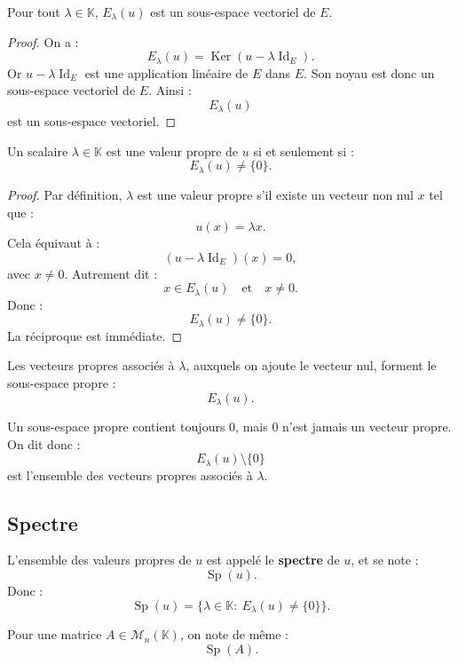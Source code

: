 \documentclass[11pt,a4paper]{article}
\newcommand{\K}{\mathbb K}
\newcommand{\M}{\mathcal M}
\newcommand{\Ker}{\operatorname{Ker}}
\newcommand{\Id}{\operatorname{Id}}
\newcommand{\Sp}{\operatorname{Sp}}
\begin{document}
\begin{theorembox}
Pour tout \(\lambda\in\K\), \(E_\lambda(u)\) est un sous-espace vectoriel de \(E\).
\end{theorembox}

\begin{proof}
On a :
\[
E_\lambda(u)=\Ker(u-\lambda\Id_E).
\]
Or \(u-\lambda\Id_E\) est une application linéaire de \(E\) dans \(E\).  
Son noyau est donc un sous-espace vectoriel de \(E\).  
Ainsi :
\[
E_\lambda(u)
\]
est un sous-espace vectoriel.
\end{proof}

\begin{theorembox}
Un scalaire \(\lambda\in\K\) est une valeur propre de \(u\) si et seulement si :
\[
E_\lambda(u)\neq\{0\}.
\]
\end{theorembox}

\begin{proof}
Par définition, \(\lambda\) est une valeur propre s'il existe un vecteur non nul \(x\) tel que :
\[
u(x)=\lambda x.
\]
Cela équivaut à :
\[
(u-\lambda\Id_E)(x)=0,
\]
avec \(x\neq0\).  
Autrement dit :
\[
x\in E_\lambda(u)
\quad\text{et}\quad
x\neq0.
\]
Donc :
\[
E_\lambda(u)\neq\{0\}.
\]
La réciproque est immédiate.
\end{proof}

\begin{retenirbox}
Les vecteurs propres associés à \(\lambda\), auxquels on ajoute le vecteur nul, forment le sous-espace propre :
\[
E_\lambda(u).
\]
\end{retenirbox}

\begin{erreurbox}
Un sous-espace propre contient toujours \(0\), mais \(0\) n'est jamais un vecteur propre.  
On dit donc :
\[
E_\lambda(u)\setminus\{0\}
\]
est l'ensemble des vecteurs propres associés à \(\lambda\).
\end{erreurbox}

\subsection{Spectre}

\begin{definitionbox}[Spectre]
L'ensemble des valeurs propres de \(u\) est appelé le \textbf{spectre} de \(u\), et se note :
\[
\Sp(u).
\]
Donc :
\[
\Sp(u)=\{\lambda\in\K:\ E_\lambda(u)\neq\{0\}\}.
\]
\end{definitionbox}

Pour une matrice \(A\in\M_n(\K)\), on note de même :
\[
\Sp(A).
\]
\end{document}

